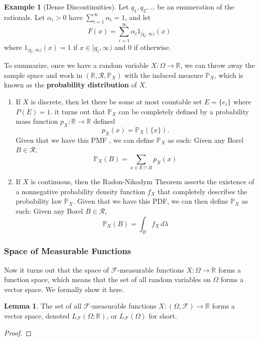 \documentclass{article}
\theoremstyle{definition}
\newtheorem{lemma}[theorem]{Lemma}
\newtheorem{example}{Example}[section]
\theoremstyle{remark}
\theoremstyle{definition}
\begin{document}
\begin{example}[Dense Discontinuities]
Let $q_1, q_2, \ldots$ be an enumeration of the rationals. Let $\alpha_i > 0$ have $\sum_{i=1}^\infty \alpha_i = 1$, and let 
\[F(x) = \sum_{i=1}^\infty \alpha_i 1_{[q_i, \infty)} (x)\]
where $1_{[q_i, \infty)} (x) = 1$ if $x \in [q_i, \infty)$ and $0$ if otherwise. 
\end{example}

To summarize, once we have a random variable $X: \Omega \rightarrow \mathbb{R}$, we can throw away the sample space and work in $(\mathbb{R}, \mathcal{R}, \mathbb{P}_X)$ with the induced measure $\mathbb{P}_X$, which is known as the \textbf{probability distribution} of $X$.  
\begin{enumerate}
    \item If $X$ is discrete, then let there be some at most countable set $E = \{e_i\}$ where $P(E) = 1$. it turns out that $\mathbb{P}_X$ can be completely defined by a probability mass function $p_X : \mathbb{R} \rightarrow \mathbb{R}$ defined 
    \[p_X (x) = \mathbb{P}_X (\{x\}).\] 
    Given that we have this PMF , we can define $\mathbb{P}_X$ as such: Given any Borel $B \in \mathcal{R}$, 
    \[\mathbb{P}_X (B) = \sum_{x \in E \cap B} p_X (x)\]

    \item If $X$ is continuous, then the Radon-Nikodym Theorem asserts the existence of a nonnegative probability density function $f_X$ that completely describes the probability law $\mathbb{P}_X$. Given that we have this PDF, we can then define $\mathbb{P}_X$ as such: Given any Borel $B \in \mathcal{R}$, 
    \[\mathbb{P}_X (B) = \int_B f_X \, d\lambda\]
\end{enumerate}

\subsubsection{Space of Measurable Functions}

Now it turns out that the space of $\mathcal{F}$-measurable functions $X: \Omega \rightarrow \mathbb{R}$ forms a function space, which means that the set of all random variables on $\Omega$ forms a vector space. We formally show it here. 

\begin{lemma}
The set of all $\mathcal{F}$-measurable functions $X: (\Omega, \mathcal{F}) \rightarrow \mathbb{R}$ forms a vector space, denoted $L_\mathcal{F} (\Omega; \mathbb{R})$, or $L_\mathcal{F} (\Omega)$ for short. 
\end{lemma}
\begin{proof}

\end{proof}
\end{document}
